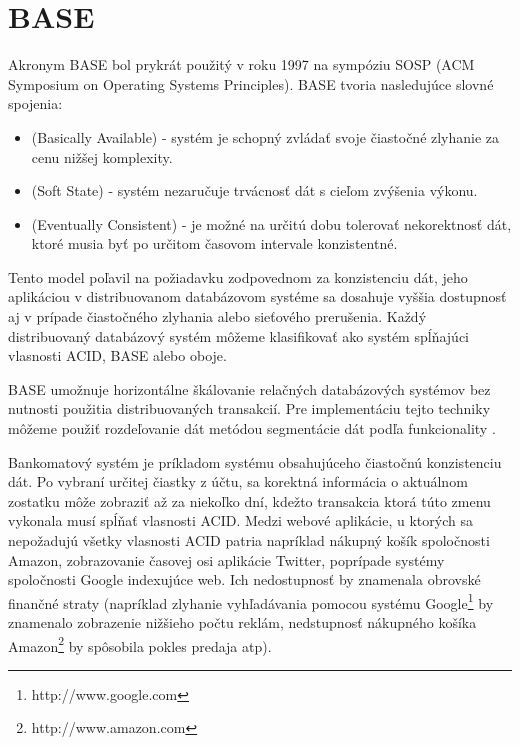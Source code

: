 \documentclass[11pt,twoside,a4paper]{book}
\begin{document}
\section{BASE} %
\label{section:base}
Akronym BASE \cite{fox1997cluster} bol prykrát použitý v roku 1997 na sympóziu SOSP (ACM Symposium on Operating Systems Principles). BASE tvoria nasledujúce slovné spojenia: 
\begin{itemize}
  \item \emph{} (Basically Available) - systém je schopný zvládať svoje čiastočné zlyhanie za cenu nižšej komplexity.
  \item \emph{} (Soft State) - systém nezaručuje trvácnosť dát s cieľom zvýšenia výkonu. %
  \item \emph{} (Eventually Consistent) - je možné na určitú dobu tolerovať nekorektnosť dát, ktoré musia byť po určitom časovom intervale konzistentné.
\end{itemize}

Tento model poľavil na požiadavku zodpovednom za konzistenciu dát, jeho aplikáciou v distribuovanom databázovom systéme sa dosahuje vyššia dostupnosť 
aj v prípade čiastočného zlyhania alebo sieťového prerušenia. Každý distribuovaný databázový systém môžeme klasifikovať ako systém spĺňajúci vlasnosti ACID, BASE alebo oboje.

BASE umožnuje horizontálne škálovanie relačných databázových systémov bez nutnosti použitia distribuovaných transakcií. Pre implementáciu tejto techniky môžeme použiť rozdeľovanie dát metódou segmentácie dát podľa funkcionality \cite{Pritchett:2008:BAA:1394127.1394128}.


Bankomatový systém je príkladom systému obsahujúceho čiastočnú konzistenciu dát. Po vybraní určitej čiastky z účtu, sa korektná informácia o aktuálnom zostatku môže zobraziť až za niekoľko dní, kdežto transakcia ktorá túto zmenu vykonala musí spĺňať vlasnosti ACID. Medzi webové aplikácie, u ktorých sa nepožadujú všetky vlasnosti ACID patria napríklad nákupný košík spoločnosti Amazon, zobrazovanie časovej osi aplikácie Twitter, poprípade systémy spoločnosti Google indexujúce web. Ich nedostupnosť by znamenala obrovské finančné straty (napríklad zlyhanie vyhľadávania pomocou systému Google\footnote{http://www.google.com} by znamenalo zobrazenie nižšieho počtu reklám, nedstupnosť nákupného košíka Amazon\footnote{http://www.amazon.com} by spôsobila pokles predaja atp).
\end{document}

